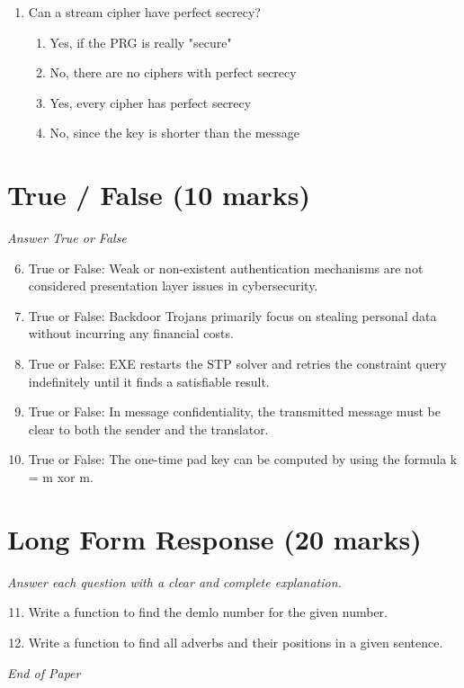 \documentclass[12pt]{article}
\begin{document}
\begin{enumerate}[label=\arabic*.]
\begin{enumerate}[label=(\alph*)]
    \item Opera browser
    \item Firefox
    \item Chrome
    \item Tor browser
\end{enumerate}
\item Can a stream cipher have perfect secrecy?
\begin{enumerate}[label=(\alph*)]
    \item Yes, if the PRG is really "secure"
    \item No, there are no ciphers with perfect secrecy
    \item Yes, every cipher has perfect secrecy
    \item No, since the key is shorter than the message
\end{enumerate}
\end{enumerate}

\section*{True / False (10 marks)}
\textit{Answer True or False}
\begin{enumerate}[label=\arabic*.]
\setcounter{enumi}{5}
\item True or False: Weak or non-existent authentication mechanisms are not considered presentation layer issues in cybersecurity.
\item True or False: Backdoor Trojans primarily focus on stealing personal data without incurring any financial costs.
\item True or False: EXE restarts the STP solver and retries the constraint query indefinitely until it finds a satisfiable result.
\item True or False: In message confidentiality, the transmitted message must be clear to both the sender and the translator.
\item True or False: The one-time pad key can be computed by using the formula k = m xor m.
\end{enumerate}

\section*{Long Form Response (20 marks)}
\textit{Answer each question with a clear and complete explanation.}
\begin{enumerate}[label=\arabic*.]
\setcounter{enumi}{10}
\item Write a function to find the demlo number for the given number.
\item Write a function to find all adverbs and their positions in a given sentence.
\end{enumerate}

\vfill
\noindent\textit{End of Paper}
\end{document}
